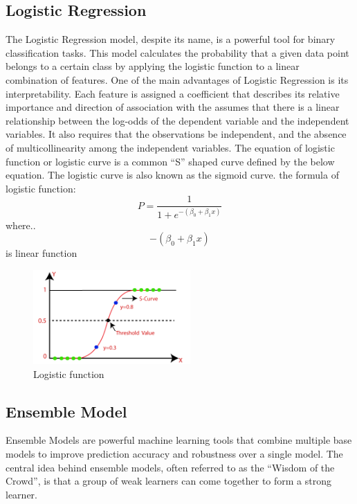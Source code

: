 \documentclass[12pt]{report}
\begin{document}
\subsection*{Logistic Regression}
The Logistic Regression model, despite its name, is a powerful tool for binary
classification tasks. This model calculates the probability that a given data
point belongs to a certain class by applying the logistic function to a linear
combination of features\cite{hosmer2013applied}. One of the main advantages of
Logistic Regression is its interpretability. Each feature is assigned a
coefficient that describes its relative importance and direction of association
with the assumes that there is a linear relationship between the log-odds of
the dependent variable and the independent variables. It also requires that the
observations be independent, and the absence of multicollinearity among the
independent variables\cite{peng2002introduction}. The equation of logistic
function or logistic curve is a common “S” shaped curve defined by the below
equation. The logistic curve is also known as the sigmoid curve\cite{sharma2022logistic}.
the formula of logistic function: \[ P=\frac{1}{1+e^{-\left(\beta_0+\beta_1 x\right)}} \]
where..\\$$ {-\left(\beta_0+\beta_1 x\right)} $$ is linear function

\begin{figure}[ht]
    \centering
    \includegraphics[width=6cm]{./figures/logistic-regression-in-machine-learning.png}
    \caption{Logistic function}\label{fig:fig3}
\end{figure}

\newpage
\subsection*{Ensemble Model}
Ensemble Models are powerful machine learning tools that combine multiple base
models to improve prediction accuracy and robustness over a single model. The
central idea behind ensemble models, often referred to as the ``Wisdom of the
Crowd'', is that a group of weak learners can come together to form a strong
learner\cite{dietterich2000ensemble}.\newline
\end{document}
